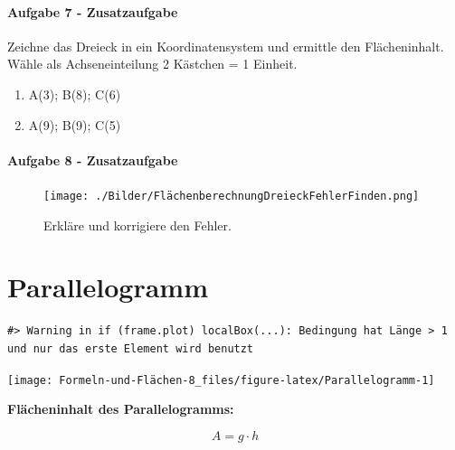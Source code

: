 \documentclass[
  ngerman,
]{book}
\begin{document}
\hypertarget{aufgabe-7---zusatzaufgabe}{%
\subsubsection*{\texorpdfstring{Aufgabe 7 - \textbf{Zusatzaufgabe}}{Aufgabe 7 - Zusatzaufgabe}}\label{aufgabe-7---zusatzaufgabe}}

Zeichne das Dreieck in ein Koordinatensystem und ermittle den Flächeninhalt. Wähle als Achseneinteilung 2 Kästchen = 1 Einheit.

\begin{enumerate}
\def\labelenumi{\alph{enumi})}
\item
  A(3); B(8); C(6)
\item
  A(9); B(9); C(5)
\end{enumerate}

\hypertarget{aufgabe-8---zusatzaufgabe}{%
\subsubsection*{\texorpdfstring{Aufgabe 8 - \textbf{Zusatzaufgabe}}{Aufgabe 8 - Zusatzaufgabe}}\label{aufgabe-8---zusatzaufgabe}}

\begin{figure}
\centering
\texttt{[image: ./Bilder/FlächenberechnungDreieckFehlerFinden.png]}
\caption{Erkläre und korrigiere den Fehler.}
\end{figure}

\hypertarget{parallelogramm}{%
\chapter{Parallelogramm}\label{parallelogramm}}

\begin{verbatim}
#> Warning in if (frame.plot) localBox(...): Bedingung hat Länge > 1 und nur das erste Element wird benutzt
\end{verbatim}

\begin{center}\texttt{[image: Formeln-und-Flächen-8\_files/figure-latex/Parallelogramm-1]} \end{center}

\textbf{Flächeninhalt des Parallelogramms:}

\[A = g \cdot h\]
\end{document}
